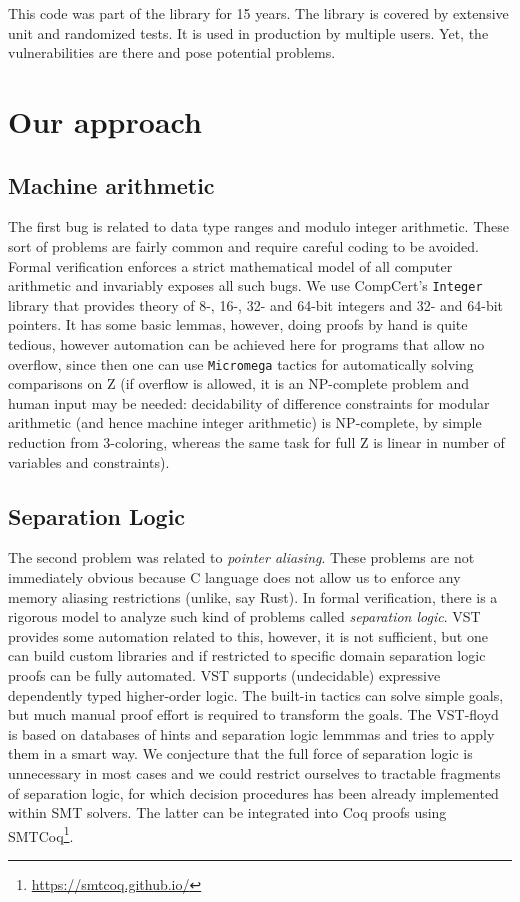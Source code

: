 \documentclass[acmsmall,nonacm]{acmart}
\begin{document}
This code was part of the library for 15 years. The library is covered by extensive unit and randomized tests. It is used in production by multiple users. Yet, the vulnerabilities are there and pose potential problems.

\section{Our approach}


\subsection{Machine arithmetic}

The first bug is related to data type ranges and modulo integer
arithmetic. These sort of problems are fairly common and require
careful coding to be avoided. Formal verification enforces a strict
mathematical model of all computer arithmetic and invariably exposes
all such bugs. We use CompCert's \texttt{Integer} library that
provides theory of 8-, 16-, 32- and 64-bit integers and 32- and 64-bit
pointers. It has some basic lemmas, however, doing proofs by hand is
quite tedious, however automation can be achieved here for programs
that allow no overflow, since then one can use
\texttt{Micromega}
tactics for automatically solving comparisons on Z (if overflow is
allowed, it is an NP-complete problem and human input may be needed:
decidability of difference constraints for modular arithmetic (and
hence machine integer arithmetic) is NP-complete, by simple reduction
from 3-coloring\cite{PointerConstraintsNP}, whereas the same task for
full Z is linear in number of variables and constraints).


\subsection{Separation Logic}

The second problem was related to \textit{pointer aliasing}. These problems are not immediately obvious because C language does not allow us to enforce any memory aliasing restrictions (unlike, say Rust). In formal verification, there is a rigorous model to analyze such kind of problems called \textit{separation logic}. VST provides some automation related to this, however, it is not sufficient, but one can build custom libraries and if restricted to specific domain separation logic proofs can be fully automated. VST supports (undecidable) expressive dependently typed higher-order logic. The built-in tactics can solve simple goals, but much manual proof effort is required to transform the goals. The VST-floyd is based on databases of hints and separation logic lemmmas and tries to apply them in a smart way. We conjecture that the full force of separation logic is unnecessary in most cases and we could restrict ourselves to tractable fragments of separation logic, for which decision procedures has been already implemented within SMT solvers. The latter can be integrated into Coq proofs using SMTCoq\footnote{\url{https://smtcoq.github.io/}}.
\end{document}
